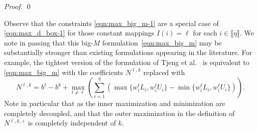 \documentclass[smallextended]{svjour3}
\begin{document}
\begin{proof}
% 
% 
% 
\qed\end{proof}

Observe that the constraints \eqref{eqn:max_big_m-1} are a special case of \eqref{eqn:max_d_box-1} for those constant mappings $I(i) = \ell$ for each $i \in \llbracket \eta \rrbracket$. We note in passing that this big-$M$ formulation~\eqref{eqn:max_big_m} may be substantially stronger than existing formulations appearing in the literature. For example, the tightest version of the formulation of Tjeng et al.~\cite{Tjeng:2017} is equivalent to \eqref{eqn:max_big_m} with the coefficients $N^{\ell,k}$ replaced with
\[
    N^{\ell,k} = b^\ell - b^k + \max\limits_{t \neq \ell} \left( \sum_{i=1}^\eta \left(\max\{w^t_iL_i,w^t_iU_i\} - \min\{w^\ell_iL_i,w^\ell_iU_i\}\right) \right).
\]
Note in particular that as the inner maximization and minimization are completely decoupled, and that the outer maximization in the definition of $N^{\ell,k,+}$ is completely independent of $k$.
\end{document}
